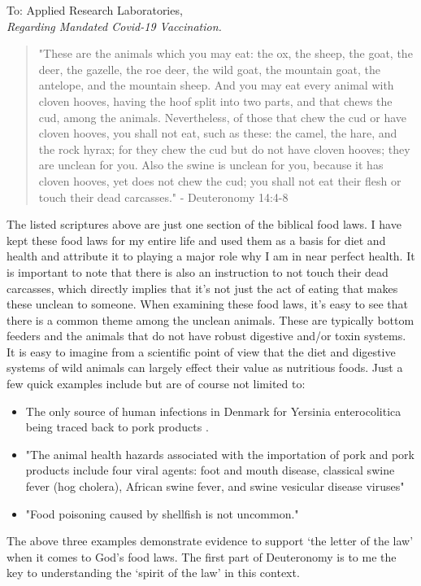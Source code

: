 \documentclass[]{letter}
\begin{document}
\begin{letter}{To: Applied Research Laboratories,\\ \textit{Regarding Mandated Covid-19 Vaccination.}}
\begin{quotation}
	"These are the animals which you may eat: the ox, the sheep, the goat, the deer, the gazelle, the roe deer, the wild goat, the mountain goat, the antelope, and the mountain sheep. And you may eat every animal with cloven hooves, having the hoof split into two parts, and that chews the cud, among the animals. Nevertheless, of those that chew the cud or have cloven hooves, you shall not eat, such as these: the camel, the hare, and the rock hyrax; for they chew the cud but do not have cloven hooves; they are unclean for you. Also the swine is unclean for you, because it has cloven hooves, yet does not chew the cud; you shall not eat their flesh or touch their dead carcasses." - Deuteronomy 14:4-8
\end{quotation}

\hspace{1cm}The listed scriptures above are just one section of the biblical food laws. I have kept these food laws for my entire life and used them as a basis for diet and health and attribute it to playing a major role why I am in near perfect health. It is important to note that there is also an instruction to not touch their dead carcasses, which directly implies that it's not just the act of eating that makes these unclean to someone. When examining these food laws, it's easy to see that there is a common theme among the unclean animals. These are typically bottom feeders and the animals that do not have robust digestive and/or toxin systems. It is easy to imagine from a scientific point of view that the diet and digestive systems of wild animals can largely effect their value as nutritious foods. Just a few quick examples include but are of course not limited to: 

\begin{itemize}
	\item The only source of human infections in Denmark for Yersinia enterocolitica being traced back to pork products \cite{unclean: Pork}.
	\item "The animal health hazards associated with the importation of pork and pork products include four viral agents: foot and mouth disease, classical swine fever (hog cholera), African swine fever, and swine vesicular disease viruses" \cite{unclean: Pork 2}
	\item "Food poisoning caused by shellfish is not uncommon." \cite{unclean: shellfish}
\end{itemize}

\hspace{1cm}The above three examples demonstrate evidence to support `the letter of the law' when it comes to God's food laws. The first part of Deuteronomy is to me the key to understanding the `spirit of the law' in this context. 


\end{letter}
\end{document}

